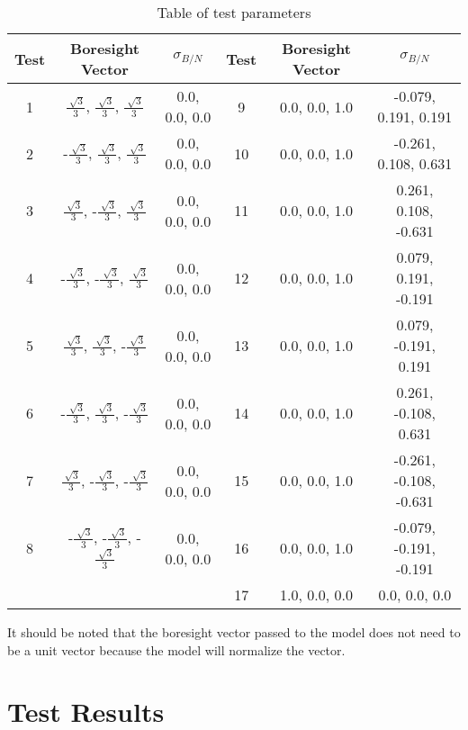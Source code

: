 \begin{table}[htbp]
	\caption{Table of test parameters}
	\label{tab:label}
	\centering \fontsize{10}{10}\selectfont
	\begin{tabular}{ c | c | c | c | c | c } %
		\hline 
		Test    & Boresight Vector &  $\sigma_{B/N}$  & Test    & Boresight Vector &  $\sigma_{B/N}$ \\
		\hline 
		1 & $\frac{\sqrt[]{3}}{3}$, $\frac{\sqrt[]{3}}{3}$, $\frac{\sqrt[]{3}}{3}$ & 0.0, 0.0, 0.0  & 9 & 0.0, 0.0, 1.0 & -0.079, 0.191, 0.191  \\
		2 & -$\frac{\sqrt[]{3}}{3}$, $\frac{\sqrt[]{3}}{3}$, $\frac{\sqrt[]{3}}{3}$ & 0.0, 0.0, 0.0  & 10 & 0.0, 0.0, 1.0 & -0.261, 0.108, 0.631 \\
		3 & $\frac{\sqrt[]{3}}{3}$, -$\frac{\sqrt[]{3}}{3}$, $\frac{\sqrt[]{3}}{3}$ & 0.0, 0.0, 0.0  & 11 & 0.0, 0.0, 1.0 & 0.261, 0.108, -0.631  \\
		4 & -$\frac{\sqrt[]{3}}{3}$, -$\frac{\sqrt[]{3}}{3}$, $\frac{\sqrt[]{3}}{3}$ & 0.0, 0.0, 0.0  & 12 & 0.0, 0.0, 1.0 & 0.079, 0.191, -0.191  \\
		5 & $\frac{\sqrt[]{3}}{3}$, $\frac{\sqrt[]{3}}{3}$, -$\frac{\sqrt[]{3}}{3}$ & 0.0, 0.0, 0.0 & 13 & 0.0, 0.0, 1.0 & 0.079, -0.191, 0.191 \\
		6 & -$\frac{\sqrt[]{3}}{3}$, $\frac{\sqrt[]{3}}{3}$, -$\frac{\sqrt[]{3}}{3}$ & 0.0, 0.0, 0.0 & 14 & 0.0, 0.0, 1.0 & 0.261, -0.108, 0.631 \\
		7 & $\frac{\sqrt[]{3}}{3}$, -$\frac{\sqrt[]{3}}{3}$, -$\frac{\sqrt[]{3}}{3}$ & 0.0, 0.0, 0.0  & 15 & 0.0, 0.0, 1.0 & -0.261, -0.108, -0.631  \\
		8 & -$\frac{\sqrt[]{3}}{3}$, -$\frac{\sqrt[]{3}}{3}$, -$\frac{\sqrt[]{3}}{3}$ & 0.0, 0.0, 0.0  & 16 & 0.0, 0.0, 1.0 & -0.079, -0.191, -0.191  \\
		&  &  & 17 & 1.0, 0.0, 0.0 & 0.0, 0.0, 0.0\\
		\hline
	\end{tabular}
\end{table}
It should be noted that the boresight vector passed to the model does not need to be a unit vector because the model will normalize the vector. 

\section{Test Results}

